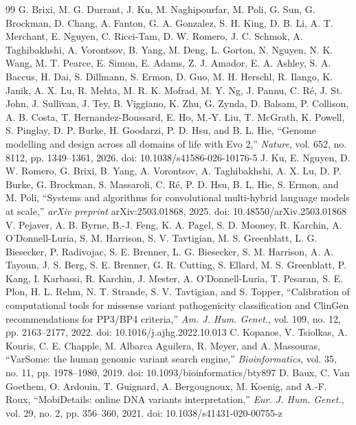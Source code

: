 \begin{thebibliography}{99}
 G. Brixi, M. G. Durrant, J. Ku, M. Naghipourfar, M. Poli, G. Sun, G. Brockman, D. Chang, A. Fanton, G. A. Gonzalez, S. H. King, D. B. Li, A. T. Merchant, E. Nguyen, C. Ricci-Tam, D. W. Romero, J. C. Schmok, A. Taghibakhshi, A. Vorontsov, B. Yang, M. Deng, L. Gorton, N. Nguyen, N. K. Wang, M. T. Pearce, E. Simon, E. Adams, Z. J. Amador, E. A. Ashley, S. A. Baccus, H. Dai, S. Dillmann, S. Ermon, D. Guo, M. H. Herschl, R. Ilango, K. Janik, A. X. Lu, R. Mehta, M. R. K. Mofrad, M. Y. Ng, J. Pannu, C. Ré, J. St. John, J. Sullivan, J. Tey, B. Viggiano, K. Zhu, G. Zynda, D. Balsam, P. Collison, A. B. Costa, T. Hernandez-Boussard, E. Ho, M.-Y. Liu, T. McGrath, K. Powell, S. Pinglay, D. P. Burke, H. Goodarzi, P. D. Hsu, and B. L. Hie, ``Genome modelling and design across all domains of life with Evo 2,'' \emph{Nature}, vol. 652, no. 8112, pp. 1349--1361, 2026. doi: 10.1038/\allowbreak s41586-026-10176-5
 J. Ku, E. Nguyen, D. W. Romero, G. Brixi, B. Yang, A. Vorontsov, A. Taghibakhshi, A. X. Lu, D. P. Burke, G. Brockman, S. Massaroli, C. Ré, P. D. Hsu, B. L. Hie, S. Ermon, and M. Poli, ``Systems and algorithms for convolutional multi-hybrid language models at scale,'' \emph{arXiv preprint} arXiv:2503.01868, 2025. doi: 10.48550/\allowbreak arXiv.2503.01868
 V. Pejaver, A. B. Byrne, B.-J. Feng, K. A. Pagel, S. D. Mooney, R. Karchin, A. O’Donnell-Luria, S. M. Harrison, S. V. Tavtigian, M. S. Greenblatt, L. G. Biesecker, P. Radivojac, S. E. Brenner, L. G. Biesecker, S. M. Harrison, A. A. Tayoun, J. S. Berg, S. E. Brenner, G. R. Cutting, S. Ellard, M. S. Greenblatt, P. Kang, I. Karbassi, R. Karchin, J. Mester, A. O’Donnell-Luria, T. Pesaran, S. E. Plon, H. L. Rehm, N. T. Strande, S. V. Tavtigian, and S. Topper, ``Calibration of computational tools for missense variant pathogenicity classification and ClinGen recommendations for PP3/BP4 criteria,'' \emph{Am. J. Hum. Genet.}, vol. 109, no. 12, pp. 2163--2177, 2022. doi: 10.1016/\allowbreak j.ajhg.2022.10.013
 C. Kopanos, V. Tsiolkas, A. Kouris, C. E. Chapple, M. Albarca Aguilera, R. Meyer, and A. Massouras, ``VarSome: the human genomic variant search engine,'' \emph{Bioinformatics}, vol. 35, no. 11, pp. 1978--1980, 2019. doi: 10.1093/\allowbreak bioinformatics/\allowbreak bty897
 D. Baux, C. Van Goethem, O. Ardouin, T. Guignard, A. Bergougnoux, M. Koenig, and A.-F. Roux, ``MobiDetails: online DNA variants interpretation,'' \emph{Eur. J. Hum. Genet.}, vol. 29, no. 2, pp. 356--360, 2021. doi: 10.1038/\allowbreak s41431-020-00755-z

\end{thebibliography}
